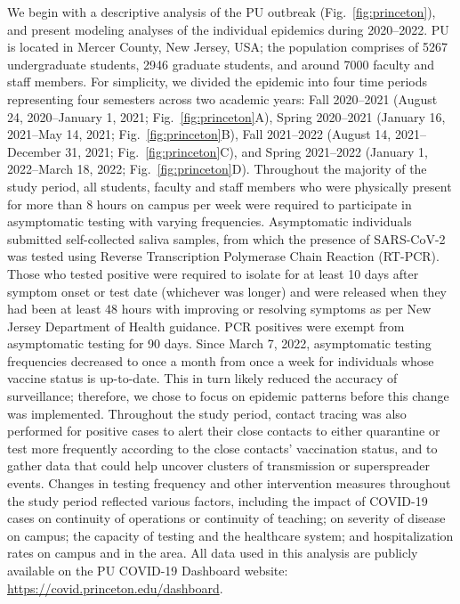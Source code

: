 \documentclass[12pt]{article}
\newcommand{\fref}[1]{Fig.~\ref{fig:#1}}
\begin{document}
We begin with a descriptive analysis of the PU outbreak (\fref{princeton}), and present modeling analyses of the individual epidemics during 2020--2022.
PU is located in Mercer County, New Jersey, USA;
the population comprises of 5267 undergraduate students, 2946 graduate students, and around 7000 faculty and staff members.
For simplicity, we divided the epidemic into four time periods representing four semesters across two academic years: Fall 2020--2021 (August 24, 2020--January 1, 2021; \fref{princeton}A), Spring 2020--2021 (January 16, 2021--May 14, 2021; \fref{princeton}B), Fall 2021--2022 (August 14, 2021--December 31, 2021; \fref{princeton}C), and Spring 2021--2022 (January 1, 2022--March 18, 2022; \fref{princeton}D).
Throughout the majority of the study period, all students, faculty and staff members who were physically present for more than 8 hours on campus per week were required to participate in asymptomatic testing with varying frequencies.
Asymptomatic individuals submitted self-collected saliva samples, from which the presence of SARS-CoV-2 was tested using Reverse Transcription Polymerase Chain Reaction (RT-PCR).  
Those who tested positive were required to isolate for at least 10 days after symptom onset or test date (whichever was longer) and were released when they had been at least 48 hours with improving or resolving symptoms as per New Jersey Department of Health guidance.
PCR positives were exempt from asymptomatic testing for 90 days.
Since March 7, 2022, asymptomatic testing frequencies decreased to once a month from once a week for individuals whose vaccine status is up-to-date. This in turn likely reduced the accuracy of surveillance; therefore, we chose to focus on epidemic patterns before this change was implemented.
Throughout the study period, contact tracing was also performed for positive cases to alert their close contacts to either quarantine or test more frequently according to the close contacts' vaccination status, and to gather data that could help uncover clusters of transmission or superspreader events.
Changes in testing frequency and other intervention measures throughout the study period reflected various factors, including the impact of COVID-19 cases on continuity of operations or continuity of teaching; on severity of disease on campus; the capacity of testing and the healthcare system; and hospitalization rates on campus and in the area.
All data used in this analysis are publicly available on the PU COVID-19 Dashboard website: \url{https://covid.princeton.edu/dashboard}.
\end{document}
